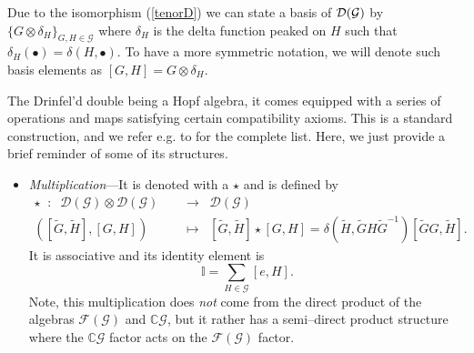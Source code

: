 \documentclass[nofootinbib,superscriptaddress,eqsecnum,tightenlines,11pt]{revtex4-1}
\def\nn{\nonumber}
\def\mG{\mathcal{G}}
\def\be{\begin{equation}}
\def\ee{\end{equation}}
\begin{document}
Due to the isomorphism (\ref{tenorD}) we can state a basis of ${\cal D}(\mG)$ by  $\{G \otimes \delta_{H}  \}_{G,H \in \mathcal{G}}$  where $\delta_H$ is the delta function peaked on $H$ such that $\delta_H({\scriptstyle \bullet}) = \delta(H,{\scriptstyle \bullet})$.
To have a more symmetric notation, we will denote such basis elements as $[G,H] = G\otimes\delta_H $.

The Drinfel'd double being a Hopf algebra, it comes equipped with a series of operations and maps satisfying certain compatibility axioms.
This is a standard construction, and we refer e.g. to \cite{hopf} for the complete list.
Here, we  just provide a brief reminder of some of its structures.
\begin{itemize}
\item[{\it i})] {\it Multiplication}---It is denoted with a $\star$ and is defined by
\begin{align}
\star \;\;  : \;\; \mathcal{D}(\mathcal{G}) \otimes \mathcal{D}(\mathcal{G})\;\;\;\; &\longrightarrow \;\;\mathcal{D}(\mathcal{G}) \\ \nn
	([\widetilde{G},\widetilde{H}],[G,H])\;\; &\longmapsto \;\;[\widetilde{G},\widetilde{H}]\star [G,H] = 
	\delta(\widetilde{H},\widetilde{G}H\widetilde{G}^{-1})[\widetilde{G}G,\widetilde{H}].
\end{align}
It is associative and its identity element is
\be
	\mathbb{I} = \sum_{H \in {\mathcal{G}}}[e,H].
\ee
Note, this multiplication does {\it not} come from the direct product of the algebras $\mathcal F(\mathcal G)$ and $\mathbb{C}\mathcal{G}$, but it rather has a semi--direct product structure where the $\mathbb{C}{\mathcal{G}}$ factor acts on the $\mathcal F(\mathcal G)$ factor.


\end{itemize}
\end{document}
